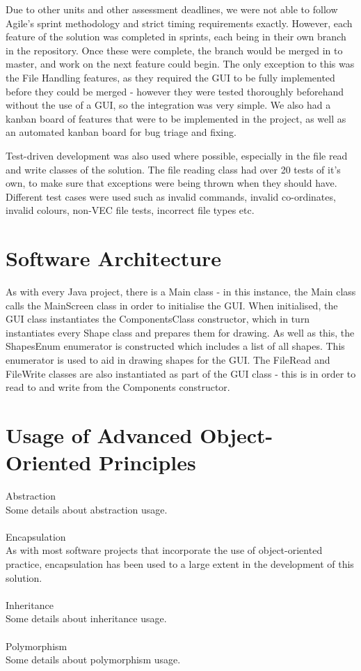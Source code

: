 \documentclass[12pt]{article} %
\begin{document}
Due to other units and other assessment deadlines, we were not able to follow Agile's sprint methodology and strict timing requirements exactly. However, each feature  of the solution was completed in sprints, each being in their own branch in the repository. Once these were complete, the branch would be merged in to master, and work on the next feature could begin. The only exception to this was the File Handling features, as they required the GUI to be fully implemented before they could be merged - however they were tested thoroughly beforehand without the use of a GUI, so the integration was very simple. We also had a kanban board of features that were to be implemented in the project, as well as an automated kanban board for bug triage and fixing.

Test-driven development was also used where possible, especially in the file read and write classes of the solution. The file reading class had over 20 tests of it's own, to make sure that exceptions were being thrown when they should have. Different test cases were used such as invalid commands, invalid co-ordinates, invalid colours, non-VEC file tests, incorrect file types etc.


\newpage

\section{Software Architecture}

As with every Java project, there is a Main class - in this instance, the Main class calls the MainScreen class in order to initialise the GUI. When initialised, the GUI class instantiates the ComponentsClass constructor, which in turn instantiates every Shape class and prepares them for drawing. As well as this, the ShapesEnum enumerator is constructed which includes a list of all shapes. This enumerator is used to aid in drawing shapes for the GUI. The FileRead and FileWrite classes are also instantiated as part of the GUI class - this is in order to read to and write from the Components constructor.

\newpage

\section{Usage of Advanced Object-Oriented Principles}
{\large Abstraction}\\
Some details about abstraction usage.
\\\\{\large Encapsulation}\\
As with most software projects that incorporate the use of object-oriented practice, encapsulation has been used to a large extent in the development of this solution.
\\\\{\large Inheritance}\\
Some details about inheritance usage.
\\\\{\large Polymorphism}\\
Some details about polymorphism usage.
\end{document}
